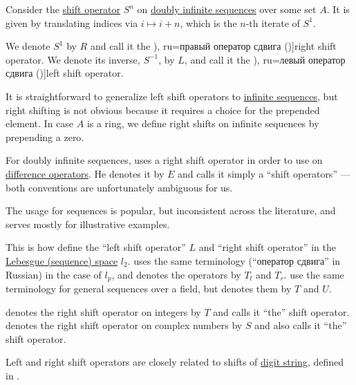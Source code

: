 \begin{definition}\label{def:sequence_shift_operator}
  Consider the \hyperref[def:shift_operator]{shift operator} \( S^n \) on \hyperref[def:doubly_infinite_sequence]{doubly infinite sequences} over some set \( A \). It is given by translating indices via \( i \mapsto i + n \), which is the \( n \)-th iterate of \( S^1 \).

  We denote \( S^1 \) by \( R \) and call it the \term[en=right shift operator (\cite[exerc. 7.26]{FabianEtAl2001FunctionalAnalysis}), ru=правый оператор сдвига (\cite[example 1.3.3]{Хелемский2014ФункциональныйАнализ})]{right shift operator}. We denote its inverse, \( S^{-1} \), by \( L \), and call it the \term[en=left shift operator (\cite[exerc. 7.26]{FabianEtAl2001FunctionalAnalysis}), ru=левый оператор сдвига (\cite[example 1.3.3]{Хелемский2014ФункциональныйАнализ})]{left shift operator}.

  It is straightforward to generalize left shift operators to \hyperref[def:sequence]{infinite sequences}, but right shifting is not obvious because it requires a choice for the prepended element. In case \( A \) is a ring, we define right shifts on infinite sequences by prepending a zero.
\end{definition}
\begin{comments}
  \item For doubly infinite sequences,  uses a right shift operator in order to use  on \hyperref[def:finite_difference_operator]{difference operators}. He denotes it by \( E \) and calls it simply a \enquote{shift operators} --- both conventions are unfortunately ambiguous for us.

  The usage for sequences is popular, but inconsistent across the literature, and serves mostly for illustrative examples.

  This is how  define the \enquote{left shift operator} \( L \) and \enquote{right shift operator} in the \hyperref[def:lebesgue_space]{Lebesgue (sequence) space} \( l_2 \).  uses the same terminology (\enquote{оператор сдвига} in Russian) in the case of \( l_p \), and denotes the operators by \( T_l \) and \( T_r \).  use the same terminology for general sequences over a field, but denotes them by \( T \) and \( U \).

   denotes the right shift operator on integers by \( T \) and calls it \enquote{the} shift operator.  denotes the right shift operator on complex numbers by \( S \) and also calls it \enquote{the} shift operator.

  \item Left and right shift operators are closely related to shifts of \hyperref[def:positional_number_system]{digit string}, defined in .
\end{comments}

